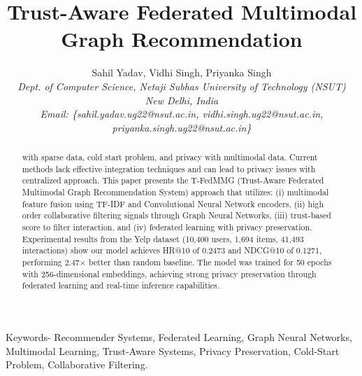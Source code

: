 \documentclass[journal]{IEEEtran} %
\begin{document}
\title{ Trust-Aware Federated Multimodal Graph Recommendation
}

\author{
    Sahil Yadav, Vidhi Singh, Priyanka Singh \\
    \textcolor{black!90}{\textit{
        Dept. of Computer Science, Netaji Subhas University of Technology (NSUT) \\
        New Delhi, India \\
        Email: \{sahil.yadav.ug22@nsut.ac.in, vidhi.singh.ug22@nsut.ac.in, priyanka.singh.ug22@nsut.ac.in\}
    }}
}

\maketitle

\begin{abstract}
with sparse data, cold start problem, and privacy with multimodal data. Current methods lack effective integration techniques and can lead to privacy issues with centralized approach. This paper presents the T-FedMMG (Trust-Aware Federated Multimodal Graph Recommendation System) approach that utilizes: (i) multimodal feature fusion using TF-IDF and Convolutional Neural Network encoders, (ii) high order collaborative filtering signals through Graph Neural Networks, (iii) trust-based score to filter interaction, and (iv) federated learning with privacy preservation. Experimental results from the Yelp dataset (10,400 users, 1,694 items, 41,493 interactions) show our model achieves HR@10 of 0.2473 and NDCG@10 of 0.1271, performing 2.47× better than random baseline. The model was trained for 50 epochs with 256-dimensional embeddings, achieving strong privacy preservation through federated learning and real-time inference capabilities.

\end{abstract}

Keywords- Recommender Systems, Federated Learning, Graph Neural Networks, Multimodal Learning, Trust-Aware Systems, Privacy Preservation, Cold-Start Problem, Collaborative Filtering. 
\end{document}
